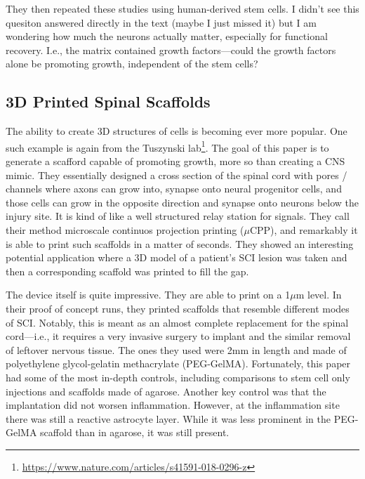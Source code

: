 \documentclass[12pt]{report}
\begin{document}
They then repeated these studies using human-derived stem cells. I didn't see this quesiton answered directly in the text (maybe I just missed it) but I am wondering how much the neurons actually matter, especially for functional recovery. I.e., the matrix contained growth factors---could the growth factors alone be promoting growth, independent of the stem cells?

\subsection{3D Printed Spinal Scaffolds}

The ability to create 3D structures of cells is becoming ever more popular. One such example is again from the Tuszynski lab\footnote{\url{https://www.nature.com/articles/s41591-018-0296-z}}. The goal of this paper is to generate a scafford capable of promoting growth, more so than creating a CNS mimic. They essentially designed a cross section of the spinal cord with pores / channels where axons can grow into, synapse onto neural progenitor cells, and those cells can grow in the opposite direction and synapse onto neurons below the injury site. It is kind of like a well structured relay station for signals. They call their method microscale continuos projection printing ($\mu$CPP), and remarkably it is able to print such scaffolds in a matter of seconds. They showed an interesting potential application where a 3D model of a patient's SCI lesion was taken and then a corresponding scaffold was printed to fill the gap. \newline

The device itself is quite impressive. They are able to print on a 1$\mu$m level. In their proof of concept runs, they printed scaffolds that resemble different modes of SCI. Notably, this is meant as an almost complete replacement for the spinal cord---i.e., it requires a very invasive surgery to implant and the similar removal of leftover nervous tissue. The ones they used were 2mm in length and made of polyethylene glycol-gelatin methacrylate (PEG-GelMA). Fortunately, this paper had some of the most in-depth controls, including comparisons to stem cell only injections and scaffolds made of agarose. Another key control was that the implantation did not worsen inflammation. However, at the inflammation site there was still a reactive astrocyte layer. While it was less prominent in the PEG-GelMA scaffold than in agarose, it was still present.\newline
\end{document}
